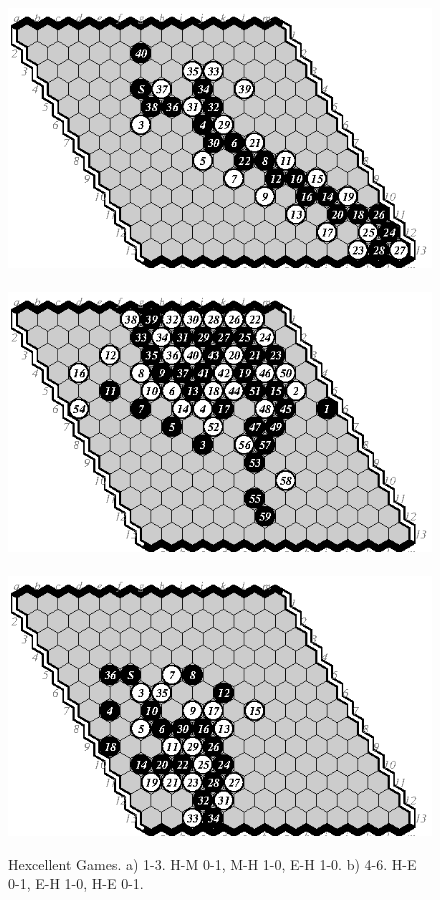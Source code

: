 \documentclass{IOS-Book-Article}
\def\Hent{\mbox{\sc Hexcellent}}
\begin{document}
\begin{figure}
\noindent\hspace*{-2cm}\
\includegraphics[scale=.9]{pix/13.he2.eps}\hspace*{-1.8cm}\
\includegraphics[scale=.9]{pix/13.eh3.eps}\hspace*{-1.8cm}\
\includegraphics[scale=.9]{pix/13.he4.eps}
\caption{\Hent{} Games.  a) 1-3. H-M 0-1, M-H 1-0, E-H 1-0.
b) 4-6. H-E 0-1, E-H 1-0, H-E 0-1.}
\end{figure}
\end{document}
